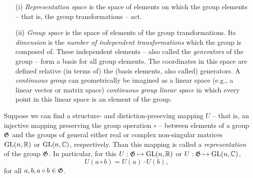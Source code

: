 \begin{itemize}
\item[(i)] {\em Representation space} is the space of elements on which the group elements -- that is, the group transformations -- act.
\item[(ii)]  {\em Group space} is the space of elements of the group transformations.
Its {\em dimension} is the {\em number of independent transformations} which the group is composed of.
These independent elements -- also called the {\em generators} of the group -- form a basis for all group elements.
The coordinates in this space are defined relative (in terms of) the (basis elements, also called) generators.
A {\em continuous group} can geometrically be imagined as a linear  space  (e.g., a linear vector or matrix space)
{\em continuous group}
{\em linear space}
in which every point in this linear space is an element of the group.
\end{itemize}


Suppose we can find a structure- and distiction-preseving mapping $  U  $ -- that is, an injective mapping preserving the group operation $\circ$  --
between elements of a group ${\frak G}$
and the groups of general either real or complex non-singular  matrices $\textrm{GL}(n,{\Bbb R})$ or $\textrm{GL}(n,{\Bbb C})$, respectively.
Than this mapping is called
a {\em representation}
 of the group ${\frak G}$.
In particular,
for this $  U  : {\frak G} \mapsto  \textrm{GL}(n,{\Bbb R})$ or $  U  : {\frak G} \mapsto \textrm{GL}(n,{\Bbb C})$,
\begin{equation}
  U  (a\circ b)   =   U  (a)\cdot   U  (b),
\end{equation}
for all
$a,b, a\circ b \in {\frak G}$.


